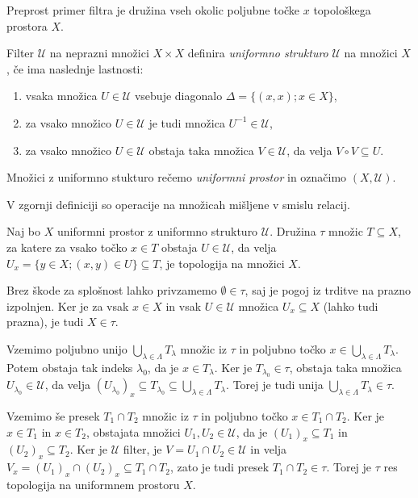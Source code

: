 \documentclass[mat1]{fmfdelo}
\newcommand{\Ucurl}{\mathcal{U}}
\begin{document}
\begin{primer}
Preprost primer filtra je družina vseh okolic poljubne točke $x$ topološkega prostora $X$. 
\end{primer}
\begin{definicija}
Filter $\mathcal{U}$ na neprazni množici $X \times X$ definira \emph{uniformno strukturo} $\Ucurl$ na množici $X$, če ima naslednje lastnosti:
\begin{enumerate}
\item vsaka množica $U \in \mathcal{U}$ vsebuje diagonalo $\Delta = \lbrace (x, x) ; x \in X \rbrace$,
\item za vsako množico $U \in \mathcal{U}$ je tudi množica $U^{-1} \in \mathcal{U}$,
\item za vsako množico $U \in \mathcal{U}$ obstaja taka množica $V \in \mathcal{U}$, da velja $V \circ V \subseteq U$.
\end{enumerate}
Množici z uniformno stukturo rečemo \emph{uniformni prostor} in označimo $(X, \Ucurl)$.
\end{definicija}

\begin{opomba}
	V zgornji definiciji so operacije na množicah mišljene v smislu relacij.
\end{opomba}

\begin{trditev}\label{trd:uniinduciranatopo}
Naj bo $X$ uniformni prostor z uniformno strukturo $\mathcal{U}$. Družina $\tau$ množic $T \subseteq X$, za katere za vsako točko $x \in T$ obstaja $U \in \mathcal{U}$, da velja $U_x = \lbrace y \in X ; (x, y) \in U \rbrace \subseteq T$, je topologija na množici $X$.
\end{trditev}

\begin{dokaz}
Brez škode za splošnost lahko privzamemo $\emptyset \in \tau$, saj je pogoj iz trditve na prazno izpolnjen. Ker je za vsak $x \in X$ in vsak $U \in \Ucurl$ množica $U_x \subseteq X$ (lahko tudi prazna), je tudi $X \in \tau$.

Vzemimo poljubno unijo $\bigcup_{\lambda \in \Lambda} T_\lambda$ množic iz $\tau$ in poljubno točko $x \in \bigcup_{\lambda \in \Lambda} T_\lambda$. Potem obstaja
tak indeks $\lambda_0$, da je $x \in T_\lambda$. Ker je $T_{\lambda_0} \in \tau$, obstaja taka množica $U_ {\lambda_0} \in \Ucurl$, da velja $(U_{\lambda_0})_x \subseteq T_{\lambda_0} \subseteq \bigcup_{\lambda \in \Lambda} T_\lambda$. Torej je tudi unija $\bigcup_{\lambda \in \Lambda} T_\lambda \in \tau$.

Vzemimo še presek $T_1 \cap T_2$ množic iz $\tau$ in poljubno točko $x \in T_1 \cap T_2$. Ker je $x \in T_1$ in $x \in T_2$, obstajata množici $U_1, U_2 \in \Ucurl$, da je $(U_{1})_x \subseteq T_1$ in $(U_{2})_x \subseteq T_2$. Ker je $\Ucurl$ filter, je $V = U_1 \cap U_2 \in \Ucurl$ in velja
$V_x = (U_{1})_x\cap (U_{2})_x \subseteq T_1 \cap T_2$, zato je tudi presek $T_1 \cap T_2 \in \tau$. Torej je $\tau$ res topologija na uniformnem prostoru $X$.
\end{dokaz}
\end{document}
